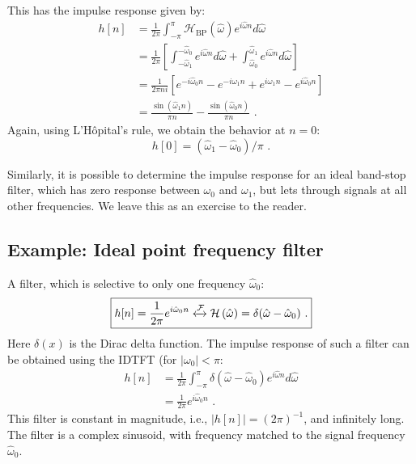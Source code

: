 This has the impulse response given by:
\begin{align}
  h[n] & = \frac{1}{2\pi}\int_{-\pi}^{\pi} \mathcal{H}_{\mathrm{BP}}(\hat{\omega}) e^{i\hat{\omega}n} d\hat{\omega}                                                                       \\
       & =\frac{1}{2\pi}\left[\int_{-\hat{\omega}_1}^{-\hat{\omega}_0} e^{i\hat{\omega}n} d\hat{\omega} + \int_{\hat{\omega}_0}^{\hat{\omega}_1} e^{i\hat{\omega}n} d\hat{\omega} \right] \\
       & =\frac{1}{2\pi ni}\left[ e^{-i\hat{\omega}_0 n} - e^{-i\omega_1 n} + e^{i\omega_1 n} - e^{i\hat{\omega}_0 n} \right]                                                             \\
       & = \frac{\sin(\hat{\omega}_1 n)}{\pi n}-\frac{\sin(\hat{\omega}_0 n)}{\pi n}\,\,.
\end{align}
Again, using L'H\^opital's rule, we obtain the behavior at $n=0$:
\begin{equation}
  h[0]=(\hat{\omega}_1 - \hat{\omega}_0)/\pi\,\,.
\end{equation}

Similarly, it is possible to determine the impulse response for
an ideal band-stop filter, which has zero response between $\omega_0$
and $\omega_1$, but lets through signals at all other frequencies. We
leave this as an exercise to the reader.

\subsection{Example: Ideal point frequency filter}
\label{pointfreq}

A filter, which is selective to only one frequency $\hat{\omega}_0$:
\begin{equation}
  \boxed{
    h[n]=\frac{1}{2\pi} e^{i\hat{\omega}_0 n} \xleftrightarrow{\mathcal{F}} \mathcal{H}\left(\hat{\omega}\right) = \delta(\hat{\omega}-\hat{\omega}_0)\,\,.
  }
\end{equation}
Here $\delta(x)$ is the Dirac delta function. The impulse response of
such a filter can be obtained using the IDTFT (for $|\omega_{0}|<\pi$:
\begin{align}
  h[n] & =\frac{1}{2\pi}\int_{-\pi}^{\pi} \delta(\hat{\omega}-\hat{\omega}_0) e^{i\hat{\omega}n} d\hat{\omega} \\
       & = \frac{1}{2\pi} e^{i\hat{\omega}_0 n}\,\,.
\end{align}
This filter is constant in magnitude, i.e., $|h[n]|=(2\pi)^{-1}$, and
infinitely long. The filter is a complex sinusoid, with frequency
matched to the signal frequency $\hat{\omega}_0$.

